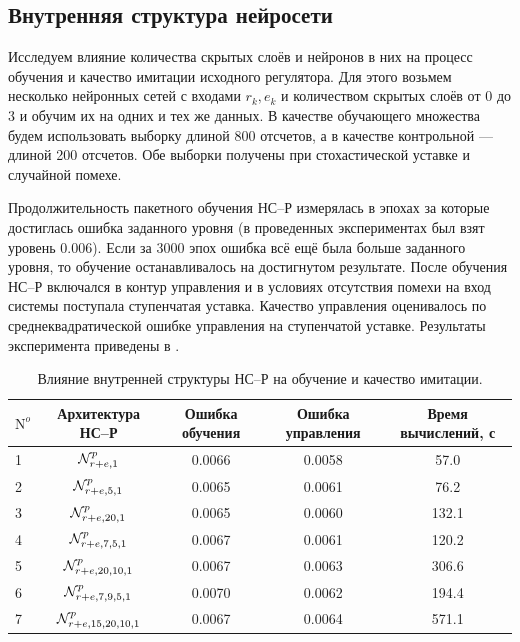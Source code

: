 \subsection{Внутренняя структура нейросети}

Исследуем влияние количества скрытых слоёв и нейронов в них на
процесс обучения и качество имитации исходного регулятора.  Для этого
возьмем несколько нейронных сетей с входами $r_k,e_k$ и количеством
скрытых слоёв от 0 до 3 и обучим их на одних и тех же данных.  В
качестве обучающего множества будем использовать выборку длиной 800
отсчетов, а в качестве контрольной --- длиной 200 отсчетов.  Обе
выборки получены при стохастической уставке и случайной помехе.

Продолжительность пакетного обучения НС--Р измерялась в эпохах за
которые достиглась ошибка заданного уровня (в проведенных
экспериментах был взят уровень 0.006).  Если за 3000 эпох ошибка всё
ещё была больше заданного уровня, то обучение останавливалось на
достигнутом результате.  После обучения НС--Р включался в контур
управления и в условиях отсутствия помехи на вход системы поступала
ступенчатая уставка.  Качество управления оценивалось по
среднеквадратической ошибке управления на ступенчатой уставке.
Результаты эксперимента приведены в .

\begin{table}
\caption{Влияние внутренней структуры НС--Р на обучение и качество имитации.}\label{tabl:nnc_internal_arch}
\begin{tabular}{|l|c|c|c|c|}
\hline
$\mathrm{N}^o$ & Архитектура НС--Р & Ошибка обучения & Ошибка управления & Время вычислений, с\\
\hline
1 & $\mathcal{N}^p_{r+e,1}$          & 0.0066& 0.0058 & 57.0\\
2 & $\mathcal{N}^p_{r+e,5,1}$        & 0.0065& 0.0061 & 76.2\\
3 & $\mathcal{N}^p_{r+e,20,1}$       & 0.0065& 0.0060 & 132.1\\
4 & $\mathcal{N}^p_{r+e,7,5,1}$      & 0.0067& 0.0061 & 120.2\\
5 & $\mathcal{N}^p_{r+e,20,10,1}$    & 0.0067& 0.0063 & 306.6\\
6 & $\mathcal{N}^p_{r+e,7,9,5,1}$    & 0.0070& 0.0062 & 194.4\\
7 & $\mathcal{N}^p_{r+e,15,20,10,1}$ & 0.0067& 0.0064 & 571.1\\
\hline
\end{tabular}
\end{table}

